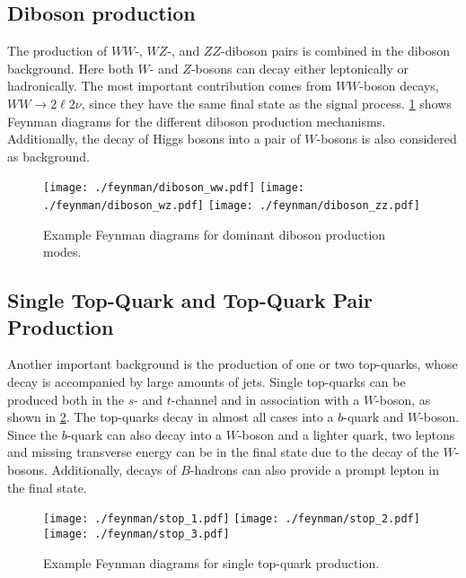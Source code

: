 \subsection{Diboson production}\label{sub:processes:diboson}

The production of $WW$-, $WZ$-, and $ZZ$-diboson pairs is combined in the
diboson background.
Here both $W$- and $Z$-bosons can decay either leptonically or hadronically.
The most important contribution comes from $WW$-boson decays, $WW \to 2 \ell 2 \nu$, since they have
the same final state as the signal process.
\cref{fig:processes:diboson} shows Feynman diagrams for the different diboson production mechanisms.
Additionally, the decay of Higgs bosons into a pair of $W$-bosons is also considered as background.

\begin{figure}[htb]
    \centering
    \texttt{[image: ./feynman/diboson\_ww.pdf]}
    \texttt{[image: ./feynman/diboson\_wz.pdf]}
    \texttt{[image: ./feynman/diboson\_zz.pdf]}
    \caption{Example Feynman diagrams for dominant diboson production modes.}\label{fig:processes:diboson}
\end{figure}


\subsection{Single Top-Quark and Top-Quark Pair Production}\label{sub:processes:top}

Another important background is the production of one or two top-quarks, whose decay is accompanied by
large amounts of jets.
Single top-quarks can be produced both in the $s$- and $t$-channel and in association with a $W$-boson, as shown in \cref{fig:processes:stop}.
The top-quarks decay in almost all cases into a $b$-quark and $W$-boson.
Since the $b$-quark can also decay into a $W$-boson and a lighter quark, two leptons and missing transverse energy can be in the final state due to
the decay of the $W$-bosons.
Additionally, decays of $B$-hadrons can also provide a prompt lepton in the final state.

\begin{figure}[htb]
    \centering
    \texttt{[image: ./feynman/stop\_1.pdf]}
    \texttt{[image: ./feynman/stop\_2.pdf]}
    \texttt{[image: ./feynman/stop\_3.pdf]}
    \caption{Example Feynman diagrams for single top-quark production.}\label{fig:processes:stop}
\end{figure}

